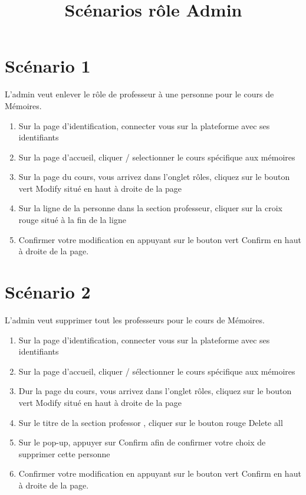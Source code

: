 \documentclass[a4paper, 11pt]{article}
\title{Scénarios rôle \bf Admin}
\author{}
\begin{document}
\maketitle

\section*{Scénario 1}
L'admin veut enlever le rôle de professeur à une personne pour le cours de Mémoires.

\begin{tcolorbox}
    \begin{enumerate}
        \item Sur la page d'identification, connecter vous sur la plateforme avec ses identifiants
        \item Sur la page d'accueil, cliquer / selectionner le cours spécifique aux mémoires
        \item Sur la page du cours, vous arrivez dans l'onglet rôles, cliquez sur le bouton vert \og Modify\fg{} situé en haut à droite de la page
        \item Sur la ligne de la personne dans la section professeur, cliquer sur la croix rouge situé à la fin de la ligne
        \item Confirmer votre modification en appuyant sur le bouton vert \og Confirm\fg{} en haut à droite de la page.
    \end{enumerate}
\end{tcolorbox}
\newpage
\section*{Scénario 2}
L'admin veut supprimer tout les professeurs pour le cours de Mémoires.

\begin{tcolorbox}
    \begin{enumerate}
        \item Sur la page d'identification, connecter vous sur la plateforme avec ses identifiants
        \item Sur la page d'accueil, cliquer / sélectionner le cours spécifique aux mémoires
        \item Dur la page du cours, vous arrivez dans l'onglet rôles, cliquez sur le bouton vert \og Modify\fg{} situé en haut à droite de la page
        \item Sur le titre de la section \og professor \fg{} , cliquer sur le bouton rouge \og Delete all\fg{}
        \item Sur le pop-up, appuyer sur \og Confirm\fg{} afin de confirmer votre choix de supprimer cette personne
        \item Confirmer votre modification en appuyant sur le bouton vert \og Confirm\fg{} en haut à droite de la page.
    \end{enumerate}
\end{tcolorbox}
\end{document}
